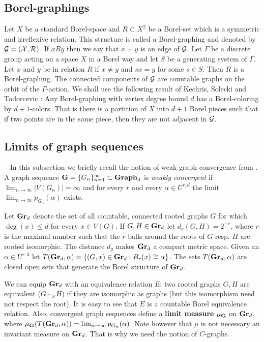 \documentclass{article}
\newcommand{\Grd}[1][d]{\textrm{\textbf{Gr}}_{#1}}
\newcommand{\Gd}[1][d]{\textrm{\textbf{Graph}}_{#1}}
\newcommand{\G}{\textrm{\textbf{G}}}
\begin{document}
\subsection{Borel-graphings}
Let $X$ be a standard Borel-space and $R\subset X^2$ be a Borel-set
which is a symmetric and irreflexive relation. This structure is called
a Borel-graphing and denoted by $\cal{G}=(X,R)$.
If $xRy$ then we say that $x\sim y$ is an edge of $\cal{G}$.
Let $\Gamma$ be a discrete group acting on a space $X$ in a Borel way
and let $S$ be a generating system of $\Gamma$. Let $x$ and $y$ be
in relation $R$ if $x\neq y$ and $sx=y$ for some $s\in S$. Then
$R$ is a Borel-graphing. The connected components of $\cal{G}$ are
countable graphs on the orbit of the $\Gamma$-action.
We shall use the following result of Kechris, Solecki and Todorcevic 
\cite{KST}: Any Borel-graphing with vertex degree bound $d$ has
a Borel-coloring by $d+1$-colors. That is there is a partition
of $X$ into $d+1$ Borel pieces such that if two points are in the
same piece, then they are not adjacent in $\cal{G}$.

\subsection{Limits of graph sequences}~\label{limitsec}
In this subsection we briefly recall the notion of weak graph convergence
from \cite{BS}.
A graph sequence $\G = \{G_n\}_{n=1}^{\infty} \subset \Gd$ is
  \textit{weakly convergent} if $\lim_{n \to \infty} |V(G_n)| = \infty$
  and for every $r$ and every $\alpha \in U^{r,d}$ the limit
  $\lim_{n\to\infty}p_{G_n}(\alpha)$ exists.

\noindent
 Let $\Grd$ denote the set of all countable, connected rooted
graphs
  $G$ for which $\deg(x) \leq d$ for every $x \in V(G)$.
If $G,H\in\Grd$ let $d_g(G,H)=2^{-r}$, where
$r$ is the maximal number such that the $r$-balls around the roots
of $G$ resp. $H$ are rooted isomorphic. The distance $d_g$  makes
$\Grd$ a compact metric space. Given an
  $\alpha \in U^{r,d}$ let $T(\Grd,\alpha) = \{(G,x) \in \Grd : B_r(x)
  \cong\alpha\}$. The sets $T(\Grd,\alpha)$ are closed open sets
that generate the Borel structure of $\Grd$.

\noindent
We can equip $\Grd$ with an equivalence relation $E$: two rooted
graphs $G,H$ are equivalent ($G \sim_E H$) if they are isomorphic as
graphs (but this isomorphism need not respect the root). It is easy
to see that $E$ is a countable Borel equivalence relation. Also,
convergent graph sequences define a {\bf limit measure} $\mu_{\G}$ on $\Grd$,
where $\mu_{\G}(T(\Grd,\alpha))=\lim_{n\to\infty}p_{G_n}(\alpha)$.
Note however that $\mu$ is not necessary an invariant measure on $\Grd$.
That is why we need the notion of $C$-graphs.
\end{document}
